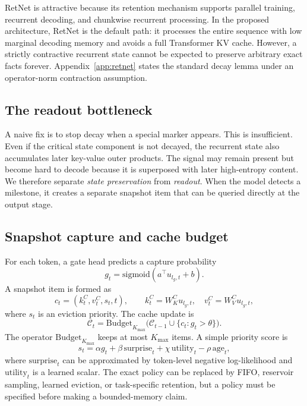 \documentclass[11pt]{article}
\newcommand{\Cache}{\mathcal{C}}
\newcommand{\sigmoid}{\mathrm{sigmoid}}
\begin{document}
RetNet is attractive because its retention mechanism supports parallel training, recurrent decoding, and chunkwise recurrent processing. In the proposed architecture, RetNet is the default path: it processes the entire sequence with low marginal decoding memory and avoids a full Transformer KV cache. However, a strictly contractive recurrent state cannot be expected to preserve arbitrary exact facts forever. Appendix~\ref{app:retnet} states the standard decay lemma under an operator-norm contraction assumption.

\subsection{The readout bottleneck}

A naive fix is to stop decay when a special marker appears. This is insufficient. Even if the critical state component is not decayed, the recurrent state also accumulates later key-value outer products. The signal may remain present but become hard to decode because it is superposed with later high-entropy content. We therefore separate \emph{state preservation} from \emph{readout}. When the model detects a milestone, it creates a separate snapshot item that can be queried directly at the output stage.

\subsection{Snapshot capture and cache budget}

For each token, a gate head predicts a capture probability
\begin{equation}
\label{eq:gate}
g_t = \sigmoid(a^\top u_{l_g,t}+b).
\end{equation}
A snapshot item is formed as
\begin{equation}
\label{eq:item}
c_t = (k_t^C, v_t^C, s_t, t),\qquad k_t^C=W_K^C u_{l_g,t},\quad v_t^C=W_V^C u_{l_g,t},
\end{equation}
where $s_t$ is an eviction priority. The cache update is
\begin{equation}
\label{eq:budget-update}
\Cache_t = \mathrm{Budget}_{K_{\max}}\Big(\Cache_{t-1}\cup \{c_t: g_t>\theta\}\Big).
\end{equation}
The operator $\mathrm{Budget}_{K_{\max}}$ keeps at most $K_{\max}$ items. A simple priority score is
\begin{equation}
\label{eq:priority}
s_t = \alpha g_t + \beta\,\mathrm{surprise}_t + \chi\,\mathrm{utility}_t - \rho\,\mathrm{age}_t,
\end{equation}
where $\mathrm{surprise}_t$ can be approximated by token-level negative log-likelihood and $\mathrm{utility}_t$ is a learned scalar. The exact policy can be replaced by FIFO, reservoir sampling, learned eviction, or task-specific retention, but a policy must be specified before making a bounded-memory claim.
\end{document}
